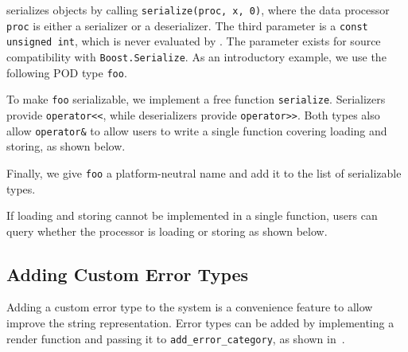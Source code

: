 \lib serializes objects by calling \lstinline^serialize(proc, x, 0)^, where the data processor \lstinline^proc^ is either a serializer or a deserializer. The third parameter is a \lstinline^const unsigned int^, which is never evaluated by \lib. The parameter exists for source compatibility with \lstinline^Boost.Serialize^. As an introductory example, we use the following POD type \lstinline^foo^.



To make \lstinline^foo^ serializable, we implement a free function \lstinline^serialize^. Serializers provide \lstinline^operator<<^, while deserializers provide \lstinline^operator>>^. Both types also allow \lstinline^operator&^ to allow users to write a single function covering loading and storing, as shown below.



Finally, we give \lstinline^foo^ a platform-neutral name and add it to the list of serializable types.



If loading and storing cannot be implemented in a single function, users can query whether the processor is loading or storing as shown below.



\subsection{Adding Custom Error Types}

Adding a custom error type to the system is a convenience feature to allow improve the string representation. Error types can be added by implementing a render function and passing it to \lstinline^add_error_category^, as shown in~.

